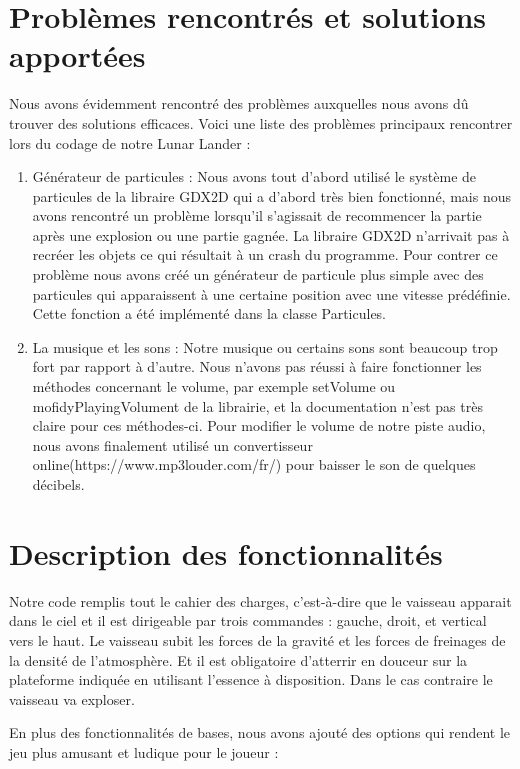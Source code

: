 \section{Problèmes rencontrés et solutions apportées}
Nous avons évidemment rencontré des problèmes auxquelles nous avons dû trouver des solutions efficaces. Voici une liste des problèmes principaux rencontrer lors du codage de notre Lunar Lander :
\begin{enumerate}
 \item Générateur de particules : Nous avons tout d’abord utilisé le système de particules de la libraire GDX2D qui a d’abord très bien fonctionné, mais nous avons rencontré un problème lorsqu’il s’agissait de recommencer la partie après une explosion ou une partie gagnée. La libraire GDX2D n’arrivait pas à recréer les objets ce qui résultait à un crash du programme. Pour contrer ce problème nous avons créé un générateur de particule plus simple avec des particules qui apparaissent à une certaine position avec une vitesse prédéfinie. Cette fonction a été implémenté dans la classe Particules.
 \item	La musique et les sons : Notre musique ou certains sons sont beaucoup trop fort par rapport à d’autre. Nous n’avons pas réussi à faire fonctionner les méthodes concernant le volume, par exemple setVolume ou mofidyPlayingVolument de la librairie, et la documentation n’est pas très claire pour ces méthodes-ci. Pour modifier le volume de notre piste audio, nous avons finalement utilisé un convertisseur online(https://www.mp3louder.com/fr/) pour baisser le son de quelques décibels.
\end{enumerate}

\section{Description des fonctionnalités}
Notre code remplis tout le cahier des charges, c’est-à-dire que le vaisseau apparait dans le ciel et il est dirigeable par trois commandes : gauche, droit, et vertical vers le haut. Le vaisseau subit les forces de la gravité et les forces de freinages de la densité de l’atmosphère. Et il est obligatoire d’atterrir en douceur sur la plateforme indiquée en utilisant l’essence à disposition. Dans le cas contraire le vaisseau va exploser.

En plus des fonctionnalités de bases, nous avons ajouté des options qui rendent le jeu plus amusant et ludique pour le joueur :

